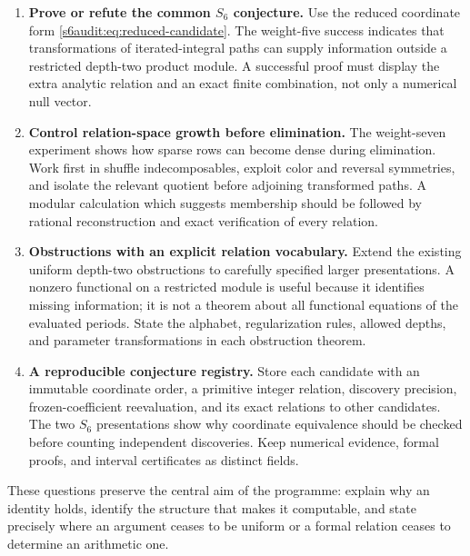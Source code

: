 \begin{enumerate}[leftmargin=*,label=G\arabic*.]
\item \textbf{Prove or refute the common $S_6$ conjecture.}
Use the reduced coordinate form
\eqref{s6audit:eq:reduced-candidate}. The weight-five success
indicates that transformations of iterated-integral paths can
supply information outside a restricted depth-two product module.
A successful proof must display the extra analytic relation and
an exact finite combination, not only a numerical null vector.

\item \textbf{Control relation-space growth before elimination.}
The weight-seven experiment shows how sparse rows can become
dense during elimination. Work first in shuffle indecomposables,
exploit color and reversal symmetries, and isolate the relevant
quotient before adjoining transformed paths. A modular calculation
which suggests membership should be followed by rational
reconstruction and exact verification of every relation.

\item \textbf{Obstructions with an explicit relation vocabulary.}
Extend the existing uniform depth-two obstructions to carefully
specified larger presentations. A nonzero functional on a
restricted module is useful because it identifies missing
information; it is not a theorem about all functional equations
of the evaluated periods. State the alphabet, regularization
rules, allowed depths, and parameter transformations in each
obstruction theorem.

\item \textbf{A reproducible conjecture registry.} Store each
candidate with an immutable coordinate order, a primitive integer
relation, discovery precision, frozen-coefficient reevaluation,
and its exact relations to other candidates. The two $S_6$
presentations show why coordinate equivalence should be checked
before counting independent discoveries. Keep numerical evidence,
formal proofs, and interval certificates as distinct fields.
\end{enumerate}

These questions preserve the central aim of the programme: explain
why an identity holds, identify the structure that makes it
computable, and state precisely where an argument ceases to be
uniform or a formal relation ceases to determine an arithmetic one.
